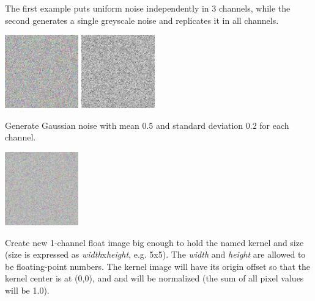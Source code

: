 \vspace{10pt}
The first example puts uniform noise independently in 3 channels, while the
second generates a single greyscale noise and replicates it in all channels.

\spc \includegraphics[width=1.25in]{figures/unifnoise3.jpg}
\spc \includegraphics[width=1.25in]{figures/unifnoise1.jpg}
\apiend

\vspace{10pt}
Generate Gaussian noise with mean 0.5 and standard deviation 0.2 for each channel.

\spc \includegraphics[width=1.25in]{figures/gaussnoise.jpg}
\apiend

\apiend


Create new 1-channel {\cf float} image big enough to hold the named
kernel and size (size is expressed as \emph{width}{\cf x}\emph{height},
e.g. {\cf 5x5}).  The \emph{width} and \emph{height} are allowed to be
floating-point numbers. The kernel image will have its origin offset so
that the kernel center is at (0,0), and and will be normalized (the sum
of all pixel values will be 1.0).

